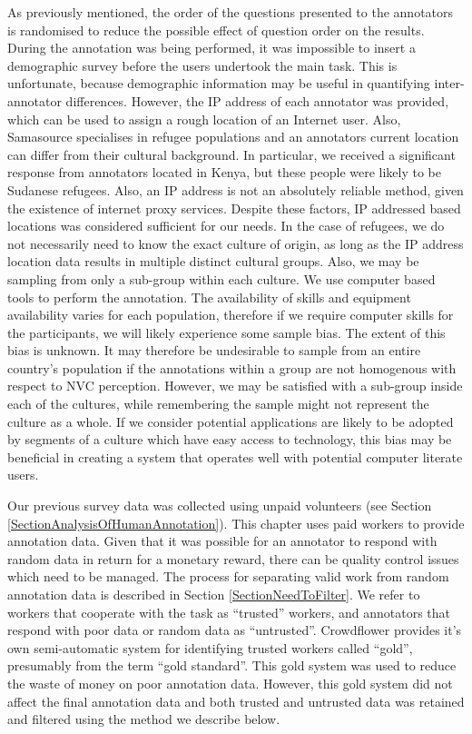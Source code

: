 As previously mentioned, the order of the questions presented to the annotators is randomised to reduce the possible effect of question order on the results. During the annotation was being performed, it was impossible to insert a demographic survey before the users undertook the main task. This is unfortunate, because demographic information may be useful in quantifying  inter-annotator differences. However, the IP address of each annotator was provided, which can be used to assign a rough location of an Internet user. Also, Samasource specialises in refugee populations and an annotators current location can differ from their cultural background. In particular, we received a significant response from annotators located in Kenya, but these people were likely to be Sudanese refugees. Also, an IP address is not an absolutely reliable method, given the existence of internet proxy services. Despite these factors, IP addressed based locations was considered sufficient for our needs. In the case of refugees, we do not necessarily need to know the exact culture of origin, as long as the IP address location data results in multiple distinct cultural groups. Also, we may be sampling from only a sub-group within each culture. We use computer based tools to perform the annotation. The availability of skills and equipment availability varies for each population, therefore if we require computer skills for the participants, we will likely experience some sample bias. The extent of this bias is unknown. It may therefore be undesirable to sample from an entire country's population if the annotations within a group are not homogenous with respect to \ac{NVC} perception. However, we may be satisfied with a sub-group inside each of the cultures, while remembering the sample might not represent the culture as a whole. If we consider potential applications are likely to be adopted by segments of a culture which have easy access to technology, this bias may be beneficial in creating a system that operates well with potential computer literate users.

Our previous survey data was collected using unpaid volunteers (see Section \ref{SectionAnalysisOfHumanAnnotation}). This chapter uses paid workers to provide annotation data. Given that it was possible for an annotator to respond with random data in return for a monetary reward, there can be quality control issues which need to be managed. The process for separating valid work from random annotation data is described in Section \ref{SectionNeedToFilter}. We refer to workers that cooperate with the task as ``trusted'' workers, and annotators that respond with poor data or random data as ``untrusted''. Crowdflower provides it's own semi-automatic system for identifying trusted workers called ``gold'', presumably from the term ``gold standard''. This gold system was used to reduce the waste of money on poor annotation data. However, this gold system did not affect the final annotation data and both trusted and untrusted data was retained and filtered using the method we describe below.

